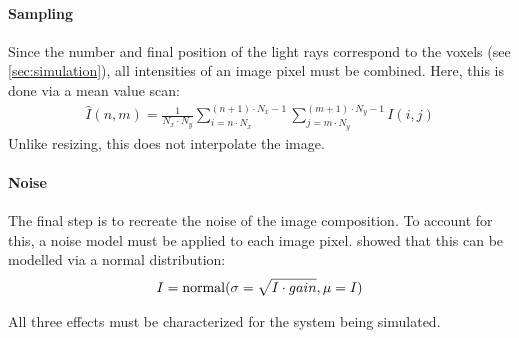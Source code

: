 \paragraph{Sampling}
Since the number and final position of the light rays correspond to the voxels (see \cref{sec:simulation}), all intensities of an image pixel must be combined.
Here, this is done via a mean value scan:
\begin{align}
    \hat{I}(n,m) =\frac{1}{N_x \cdot N_y} \sum_{i=n \cdot N_x}^{(n+1) \cdot N_x-1}\sum_{j=m \cdot N_y}^{(m+1) \cdot N_y-1} I(i,j)
\end{align}
Unlike resizing, this does not interpolate the image.
%
\paragraph{Noise}
The final step is to recreate the noise of the image composition.
To account for this, a noise model must be applied to each image pixel.
\cite{Wiese:887678} showed that this can be modelled via a normal distribution:
%
\begin{align}
    I = \operatorname{normal}(\sigma = \sqrt{I \cdot gain}, \mu=I)
\end{align}
%
\par
%
All three effects must be characterized for the system being simulated.